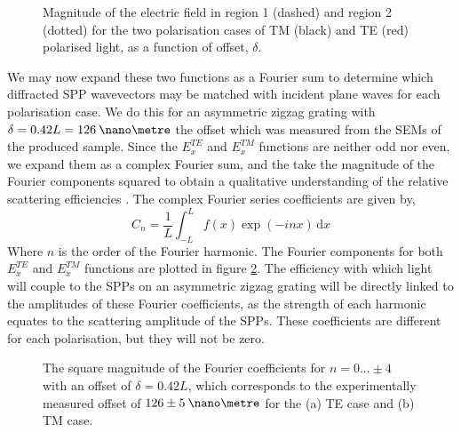 \begin{figure}
\begin{center}

\end{center}
\caption[Magnitude of the electric field in region 1 and region 2, for the two polarisation cases of TM and TE polarised light.]{Magnitude of the electric field in region 1 (dashed) and region 2 (dotted) for the two polarisation cases of TM (black) and TE (red) polarised light, as a function of offset, $\delta$.  \label{fig:as-maxEwithdelta}}
\end{figure}

We may now expand these two functions as a Fourier sum to determine which diffracted SPP wavevectors may be matched with incident plane waves for each polarisation case. We do this for an asymmetric zigzag grating with $\delta=0.42L=126\:\nano\metre$ the offset which was measured from the SEMs of the produced sample. Since the $E_{x}^{TE}$ and $E_{x}^{TM}$ functions are neither odd nor even, we expand them as a complex Fourier sum, and the take the magnitude of the Fourier components squared to obtain a qualitative understanding of the relative scattering efficiencies \cite{Goodman2005}. The complex Fourier series coefficients are given by,
\begin{equation}
C_n=\frac{1}{L} \int_{-L}^L \! f(x)\exp{(-inx)} \, \mathrm{d} x
\end{equation}
Where $n$ is the order of the Fourier harmonic. The Fourier components for both $E_x^{TE}$ and $E_x^{TM}$ functions are plotted in figure \ref{fig:as-fouriers}. The efficiency with which light will couple to the SPPs on an asymmetric zigzag grating will be directly linked to the amplitudes of these Fourier coefficients, as the strength of each harmonic equates to the scattering amplitude of the SPPs. These coefficients are different for each polarisation, but they will not be zero. 
\begin{figure}
\begin{center}
\subfigure[TE]{}
\subfigure[TM]{}
\end{center}
\caption[The square magnitude of the Fourier coefficients for $n=0...\pm 4$ with an offset of $\delta=0.42L$.]{The square magnitude of the Fourier coefficients for $n=0...\pm 4$ with an offset of $\delta=0.42L$, which corresponds to the experimentally measured offset of $126 \pm 5 \:\nano\metre$ for the (a) TE case and (b) TM case. \label{fig:as-fouriers}}
\end{figure}

